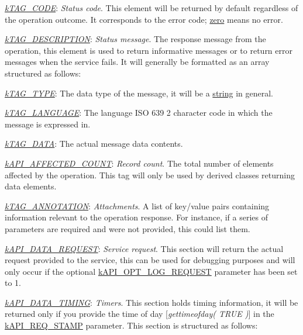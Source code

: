{\begin{DoxyItemize}
\begin{DoxyItemize}
\item {\itshape \hyperlink{}{k\-T\-A\-G\-\_\-\-C\-O\-D\-E}}\-: {\itshape Status code}. This element will be returned by default regardless of the operation outcome. It corresponds to the error code; \hyperlink{}{zero} means no error. 
\item {\itshape \hyperlink{}{k\-T\-A\-G\-\_\-\-D\-E\-S\-C\-R\-I\-P\-T\-I\-O\-N}}\-: {\itshape Status message}. The response message from the operation, this element is used to return informative messages or to return error messages when the service fails. It will generally be formatted as an array structured as follows\-: 
\begin{DoxyItemize}
\item {\itshape \hyperlink{}{k\-T\-A\-G\-\_\-\-T\-Y\-P\-E}}\-: The data type of the message, it will be a \hyperlink{}{string} in general. 
\item {\itshape \hyperlink{}{k\-T\-A\-G\-\_\-\-L\-A\-N\-G\-U\-A\-G\-E}}\-: The language I\-S\-O 639 2 character code in which the message is expressed in. 
\item {\itshape \hyperlink{}{k\-T\-A\-G\-\_\-\-D\-A\-T\-A}}\-: The actual message data contents. 
\end{DoxyItemize}
\item {\itshape \hyperlink{}{k\-A\-P\-I\-\_\-\-A\-F\-F\-E\-C\-T\-E\-D\-\_\-\-C\-O\-U\-N\-T}}\-: {\itshape Record count}. The total number of elements affected by the operation. This tag will only be used by derived classes returning data elements. 
\item {\itshape \hyperlink{}{k\-T\-A\-G\-\_\-\-A\-N\-N\-O\-T\-A\-T\-I\-O\-N}}\-: {\itshape Attachments}. A list of key/value pairs containing information relevant to the operation response. For instance, if a series of parameters are required and were not provided, this could list them. 
\end{DoxyItemize}
\item {\itshape \hyperlink{}{k\-A\-P\-I\-\_\-\-D\-A\-T\-A\-\_\-\-R\-E\-Q\-U\-E\-S\-T}}\-: {\itshape Service request}. This section will return the actual request provided to the service, this can be used for debugging purposes and will only occur if the optional \hyperlink{}{k\-A\-P\-I\-\_\-\-O\-P\-T\-\_\-\-L\-O\-G\-\_\-\-R\-E\-Q\-U\-E\-S\-T} parameter has been set to 1. 
\item {\itshape \hyperlink{}{k\-A\-P\-I\-\_\-\-D\-A\-T\-A\-\_\-\-T\-I\-M\-I\-N\-G}}\-: {\itshape Timers}. This section holds timing information, it will be returned only if you provide the time of day \mbox{[}{\itshape gettimeofday( T\-R\-U\-E )}\mbox{]} in the \hyperlink{}{k\-A\-P\-I\-\_\-\-R\-E\-Q\-\_\-\-S\-T\-A\-M\-P} parameter. This section is structured as follows\-: 

\end{DoxyItemize}}
